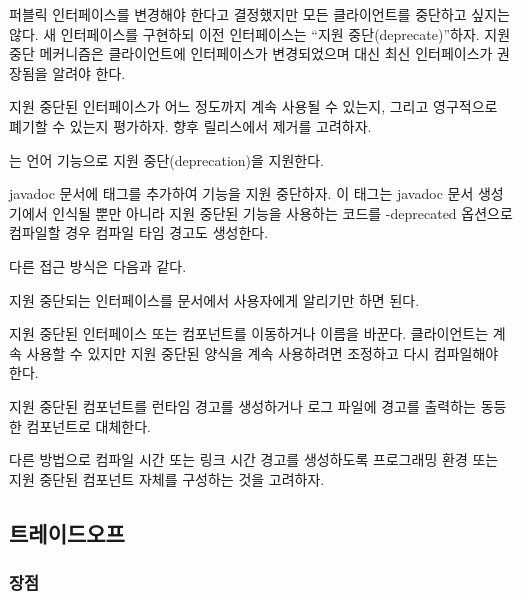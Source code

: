 \documentclass[a4paper,10pt,twoside]{book}
\begin{document}
\begin{bulletlist}
\item 퍼블릭 인터페이스를 변경해야 한다고 결정했지만 모든 클라이언트를 중단하고 싶지는 않다. 새 인터페이스를 구현하되 이전 인터페이스는 ``지원 중단(deprecate)''하자. 지원 중단 메커니즘은 클라이언트에 인터페이스가 변경되었으며 대신 최신 인터페이스가 권장됨을 알려야 한다.

\item 지원 중단된 인터페이스가 어느 정도까지 계속 사용될 수 있는지, 그리고 영구적으로 폐기할 수 있는지 평가하자. 향후 릴리스에서 제거를 고려하자.

\item {}는 언어 기능으로 지원 중단(deprecation)을 지원한다.
\begin{bulletlist}
\item javadoc 문서에  태그를 추가하여 기능을 지원 중단하자. 이 태그는 javadoc 문서 생성기에서 인식될 뿐만 아니라 지원 중단된 기능을 사용하는 코드를 -deprecated 옵션으로 컴파일할 경우 컴파일 타임 경고도 생성한다.
\end{bulletlist}

\item 다른 접근 방식은 다음과 같다.

\begin{bulletlist}
\item 지원 중단되는 인터페이스를 문서에서 사용자에게 알리기만 하면 된다.

\item 지원 중단된 인터페이스 또는 컴포넌트를 이동하거나 이름을 바꾼다. 클라이언트는 계속 사용할 수 있지만 지원 중단된 양식을 계속 사용하려면 조정하고 다시 컴파일해야 한다.

\item 지원 중단된 컴포넌트를 런타임 경고를 생성하거나 로그 파일에 경고를 출력하는 동등한 컴포넌트로 대체한다. 

\item 다른 방법으로 컴파일 시간 또는 링크 시간 경고를 생성하도록 프로그래밍 환경 또는 지원 중단된 컴포넌트 자체를 구성하는 것을 고려하자.
\end{bulletlist}
\end{bulletlist}

\subsection*{트레이드오프}

\subsubsection*{장점}
\end{document}
